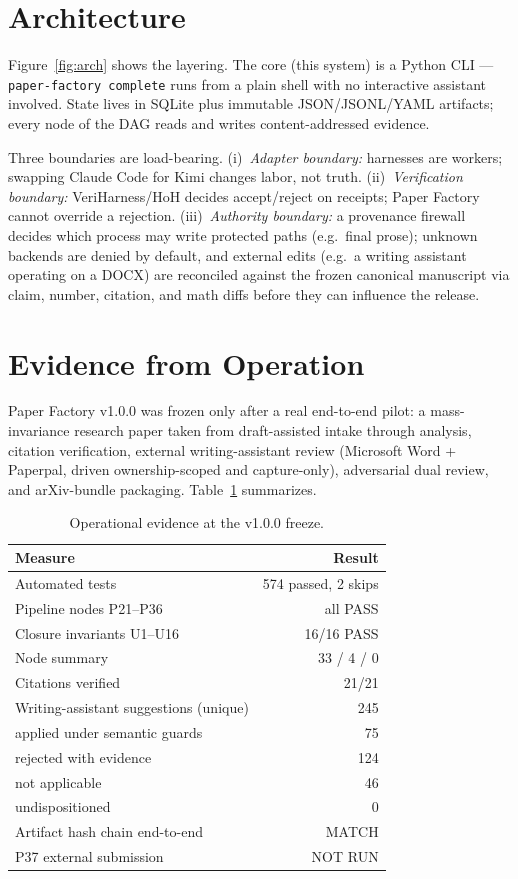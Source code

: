 \documentclass[10pt,twocolumn]{article}
\begin{document}
\section{Architecture}

Figure~\ref{fig:arch} shows the layering. The core (this system) is a Python
CLI --- \texttt{paper-factory complete} runs from a plain shell with no
interactive assistant involved. State lives in SQLite plus immutable
JSON/JSONL/YAML artifacts; every node of the DAG reads and writes
content-addressed evidence.

Three boundaries are load-bearing. (i)~\emph{Adapter boundary:} harnesses are
workers; swapping Claude Code for Kimi changes labor, not truth.
(ii)~\emph{Verification boundary:} VeriHarness/HoH decides accept/reject on
receipts; Paper Factory cannot override a rejection.
(iii)~\emph{Authority boundary:} a provenance firewall decides which process
may write protected paths (e.g.\ final prose); unknown backends are denied by
default, and external edits (e.g.\ a writing assistant operating on a DOCX)
are reconciled against the frozen canonical manuscript via claim, number,
citation, and math diffs before they can influence the release.

\section{Evidence from Operation}

Paper Factory v1.0.0 was frozen only after a real end-to-end pilot: a
mass-invariance research paper taken from draft-assisted intake through
analysis, citation verification, external writing-assistant review (Microsoft
Word + Paperpal, driven ownership-scoped and capture-only), adversarial dual
review, and arXiv-bundle packaging. Table~\ref{tab:evidence} summarizes.

\begin{table}[t]
\centering\small
\caption{Operational evidence at the v1.0.0 freeze.}
\label{tab:evidence}
\begin{tabular}{@{}p{}r@{}}
\toprule
\textbf{Measure} & \textbf{Result} \\
\midrule
Automated tests & 574 passed, 2 skips \\
Pipeline nodes P21--P36 & all PASS \\
Closure invariants U1--U16 & 16/16 PASS \\
Node summary & 33 / 4 / 0 \\
Citations verified & 21/21 \\
Writing-assistant suggestions (unique) & 245 \\
\quad applied under semantic guards & 75 \\
\quad rejected with evidence & 124 \\
\quad not applicable & 46 \\
\quad undispositioned & 0 \\
Artifact hash chain end-to-end & MATCH \\
P37 external submission & NOT RUN \\
\bottomrule
\end{tabular}
\end{table}
\end{document}
